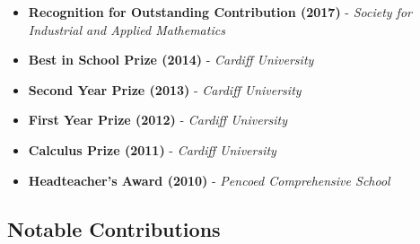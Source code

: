 \documentclass[11pt,a4paper,sans]{moderncv}        %
\begin{document}
\begin{itemize}

\item{\textbf{Recognition for Outstanding Contribution (2017)} - \small{\textit{Society for Industrial and Applied Mathematics}}}

\vspace{6pt}

\item{\textbf{Best in School Prize (2014)} - \small{\textit{Cardiff University}}}

\vspace{6pt}

\item{\textbf{Second Year Prize (2013)} - \small{\textit{Cardiff University}}}

\vspace{6pt}

\item{\textbf{First Year Prize (2012)} - \small{\textit{Cardiff University}}}

\vspace{6pt}

\item{\textbf{Calculus Prize (2011)} - \small{\textit{Cardiff University}}}

\vspace{6pt}

\item{\textbf{Headteacher's Award (2010)}  - \small{\textit{Pencoed Comprehensive School}}}

\end{itemize}

\newpage

\subsection{Notable Contributions}

\vspace{5pt}
\end{document}
